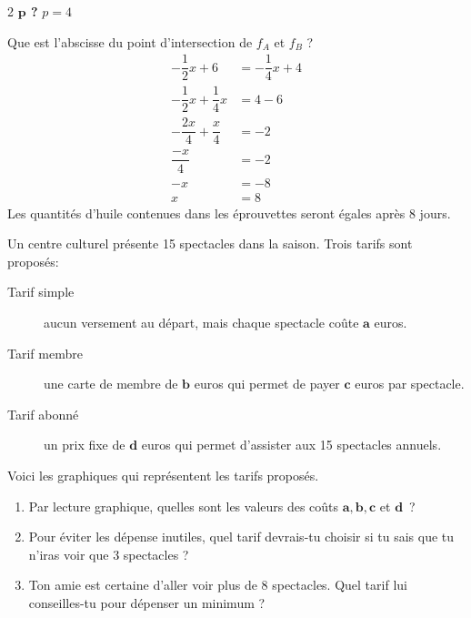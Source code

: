 \documentclass[a4paper, 12pt, parskip=half-]{scrartcl}
\begin{document}
\begin{solution}
\begin{enumerate}
\begin{multicols}{2}
                  \textbf{$\bm{p}$ ?}
                  \medbreak
                  $p=4$
              \end{multicols}
              Que est l'abscisse du point d'intersection de $f_A$ et $f_B$ ?
              \begin{align*}
                  -\dfrac{1}{2}x + 6             & = -\dfrac{1}{4}x + 4 \\
                  -\dfrac{1}{2}x + \dfrac{1}{4}x & = 4 - 6              \\
                  -\dfrac{2x}{4} + \dfrac{x}{4}  & = -2                 \\
                  \dfrac{-x}{4}                  & = -2                 \\
                  -x                             & = -8                 \\
                  x                              & = 8
              \end{align*}
              Les quantités d'huile contenues dans les éprouvettes seront égales après 8 jours.
    \end{enumerate}
\end{solution}
\begin{exercise}[points=4]
    Un centre culturel présente 15 spectacles dans la saison.
    Trois tarifs sont proposés:
    \begin{description}
        \item[Tarif simple] aucun versement au départ, mais chaque spectacle coûte $\bm{a}$ euros.
        \item[Tarif membre] une carte de membre de $\bm{b}$ euros qui permet de payer $\bm{c}$ euros par spectacle.
        \item[Tarif abonné] un prix fixe de $\bm{d}$ euros qui permet d'assister aux 15 spectacles annuels.
    \end{description}
    Voici les graphiques qui représentent les tarifs proposés.
    \begin{center}
        
    \end{center}
    \begin{enumerate}
        \item Par lecture graphique, quelles sont les valeurs des coûts $\bm{a}, \bm{b}, \bm{c}$ et $\bm{d}$~?
        \item Pour éviter les dépense inutiles, quel tarif devrais-tu choisir si tu sais que tu n'iras voir que 3 spectacles ?
        \item Ton amie est certaine d'aller voir plus de 8 spectacles. Quel tarif lui conseilles-tu pour dépenser un minimum ?
    \end{enumerate}
\end{exercise}
\end{document}
